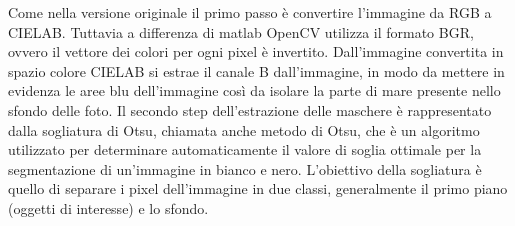 \documentclass[a4paper,12pt]{report}
\begin{document}
      Come nella versione originale il primo passo è convertire l'immagine da RGB a CIELAB.
      Tuttavia a differenza di matlab OpenCV utilizza il formato BGR, ovvero il vettore dei colori per ogni pixel è invertito.
      Dall'immagine convertita in spazio colore CIELAB si estrae il canale B dall'immagine, in modo da mettere in evidenza 
      le aree blu dell'immagine così da isolare la parte di mare presente nello sfondo delle foto.
      \newpage
      Il secondo step dell'estrazione delle maschere è rappresentato dalla sogliatura di Otsu, chiamata anche metodo di Otsu, che è un algoritmo utilizzato per determinare automaticamente il valore di soglia ottimale per la segmentazione di un'immagine in bianco e nero.
      L'obiettivo della sogliatura è quello di separare i pixel dell'immagine in due classi, generalmente il primo piano (oggetti di interesse) e lo sfondo.
\end{document}
